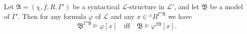 Let $\mathfrak{A} = (\chi, f, R, \Gamma')$ be a syntactical $\mathcal{L}$-structure in $\mathcal{L}'$, and let $\mathfrak{B}$ be a model of $\Gamma'$. Then for any formula $\varphi$ of $\mathcal{L}$ and any $x \in {}^\omega B^{\Gamma' \mathfrak{A}}$ we have
$$\mathfrak{B}^{\Gamma' \mathfrak{A}} \models \varphi[x] \quad \text{iff} \quad \mathfrak{B} \models \varphi^{2\mathfrak{A}}[x].$$
